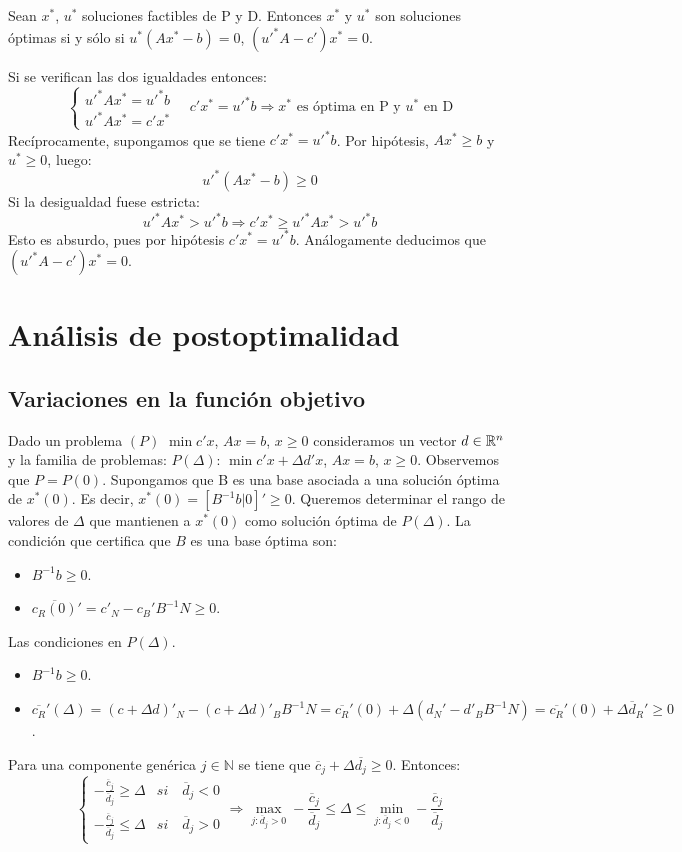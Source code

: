 \documentclass[PM.tex]{subfiles}
\begin{document}
\begin{theorem} Sean $x^*$, $u^*$ soluciones factibles de P y D. Entonces $x^*$ y $u^*$ son soluciones óptimas si y sólo si $u^*(Ax^*-b)=0$, $(u'^{*} A-c')x^*=0$.
\end{theorem}
\begin{dem} Si se verifican las dos igualdades entonces:
\[
\begin{cases}
u'^* A x^* = u'^*b \\
u'^*A x^* = c'x^* 
\end{cases}
\quad c'x^* = u'^*b \Rightarrow \text{$x^*$ es óptima en P y $u^*$ en D}
\]
Recíprocamente, supongamos que se tiene $c'x^*=u'^*b$. Por hipótesis, $Ax^*\geq b$ y $u^* \geq 0$, luego:
\[
u'^*(Ax^*-b)\geq 0
\]
Si la desigualdad fuese estricta:
\[
u'^*Ax^* > u'^* b \Rightarrow c'x^* \geq u'^*Ax^*>u'^*b
\]
Esto es absurdo, pues por hipótesis $c'x^*=u'^*b$. Análogamente deducimos que $(u'^*A-c')x^* = 0$.
\end{dem}
\section{Análisis de postoptimalidad}
\subsection{Variaciones en la función objetivo}
Dado un problema $(P)$ $\min c'x$, $Ax=b$, $x\geq 0$ consideramos un vector $d\in\mathbb{R}^n$ y la familia de problemas: $P(\Delta)$: $\min c'x + \Delta d'x$, $Ax=b$, $x\geq 0$. Observemos que $P=P(0)$. Supongamos que B es una base asociada a una solución óptima de $x^*(0)$. Es decir, $x^*(0)=[B^{-1}b | 0]' \geq 0$. Queremos determinar el rango de valores de $\Delta$ que mantienen a $x^*(0)$ como solución óptima de $P(\Delta)$. La condición que certifica que $B$ es una base óptima son:
\begin{itemize}
\item $B^{-1}b \geq 0$.
\item $\overline{c_R(0)}'  = c'_N - c_B'B^{-1}N \geq 0$. 
\end{itemize}
Las condiciones en $P(\Delta)$. 
\begin{itemize}
\item $B^{-1}b \geq 0$.
\item $\overline{c_R}'(\Delta) = (c +\Delta d)'_N- (c+\Delta d)'_B B^{-1}N = \overline{c_R}'(0)  + \Delta (d_N'-d'_BB^{-1}N) =  \overline{c_R}'(0) + \Delta \overline{d}_R'\geq 0$. 
\end{itemize}
Para una componente genérica $j\in \mathbb{N}$ se tiene que $\overline{c}_j+\Delta \overline{d_j}\geq 0$. Entonces:
\[
\begin{cases}
-\frac{\overline{c}_j}{\overline{d}_j} \geq \Delta & si \quad \overline{d}_j <0\\
-\frac{\overline{c}_j}{\overline{d}_j} \leq \Delta & si \quad \overline{d}_j >0
\end{cases}
\Rightarrow \max_{j:\overline{d}_j >0}-\frac{\overline{c}_j}{\overline{d}_j} \leq \Delta \leq \min_{j:\overline{d}_j <0}-\frac{\overline{c}_j}{\overline{d}_j}
\]
\end{document}
